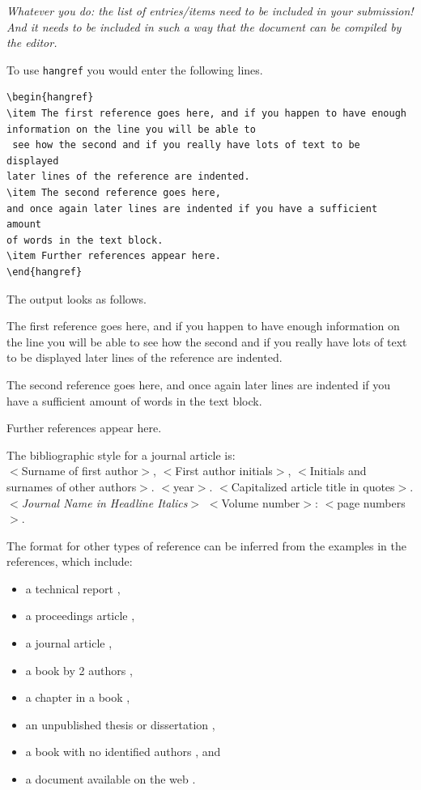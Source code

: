 \documentclass{wscpaperproc}
\theoremstyle{wsc}
\begin{document}
{\em Whatever you do: the list of entries/items need to be included in your submission! And it needs to be included in such a way that the document can be compiled by the editor.}

To use {\tt hangref} you would enter the following lines.\newline


\begin{verbatim}
\begin{hangref}
\item The first reference goes here, and if you happen to have enough
information on the line you will be able to
 see how the second and if you really have lots of text to be displayed
later lines of the reference are indented.
\item The second reference goes here,
and once again later lines are indented if you have a sufficient amount
of words in the text block.
\item Further references appear here.
\end{hangref}
\end{verbatim}\vspace{4mm}

The output looks as follows.
\begin{hangref}
\item The first reference goes here, and if you happen to have enough information
on the line you will be able to
 see how the second and if you really have lots of text to be displayed later
lines of the reference are indented.
\item The second reference goes here,
and once again later lines are indented if you have a sufficient amount of words in the text block.
\item Further references appear here.
\end{hangref}

The bibliographic style for a journal article is: \\
$<$Surname of first author$>$, $<$First author initials$>$,
$<$Initials and surnames of other authors$>$. $<$year$>$.
$<$Capitalized article title in quotes$>$. $<${\em Journal Name in
Headline Italics}$>$ $<$Volume number$>$: $<$page numbers$>$.

The format for other types of reference can be inferred from the examples in the references, which include:
\begin{itemize}
\item a technical report \cite{chi89},
\item a proceedings article \cite{cheng:input94},
\item a journal article \cite{gupta:mnormal},
\item a book by 2 authors \cite{hammersley:montecarlo},
\item a chapter in a book \cite{sch79},
\item an unpublished thesis or dissertation \cite{ste99},
\item a book with no identified authors \cite{chicago03}, and
\item a document available on the web \cite{Foundation}.
\end{itemize}
\end{document}
